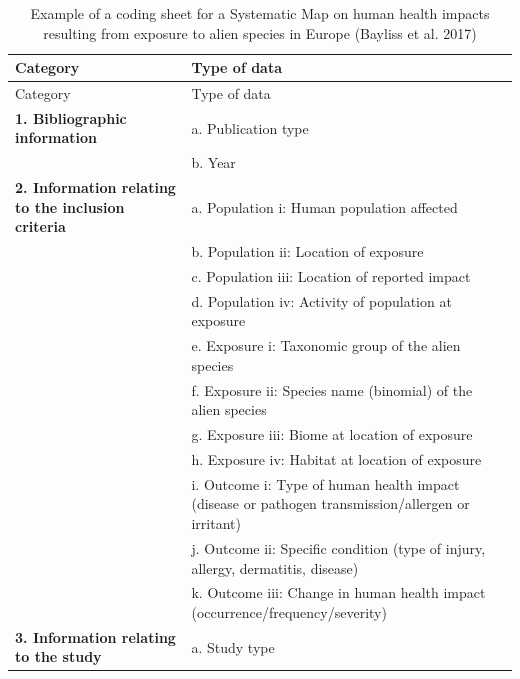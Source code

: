 \documentclass[
  letterpaper,
  DIV=11,
  numbers=noendperiod]{scrreprt}
\begin{document}
\begin{longtable}[]{@{}
  >{\raggedright\arraybackslash}p{}
  >{\raggedright\arraybackslash}p{}@{}}
\caption{Example of a coding sheet for a Systematic Map on human health
impacts resulting from exposure to alien species in Europe (Bayliss et
al. 2017)}\label{tbl-code}\tabularnewline
\toprule\noalign{}
\begin{minipage}[b]{\linewidth}\raggedright
Category
\end{minipage} & \begin{minipage}[b]{\linewidth}\raggedright
Type of data
\end{minipage} \\
\midrule\noalign{}
\endfirsthead
\toprule\noalign{}
\begin{minipage}[b]{\linewidth}\raggedright
Category
\end{minipage} & \begin{minipage}[b]{\linewidth}\raggedright
Type of data
\end{minipage} \\
\midrule\noalign{}
\endhead
\bottomrule\noalign{}
\endlastfoot
\textbf{1. Bibliographic information} & a. Publication type \\
& b. Year \\
\textbf{2. Information relating to the inclusion criteria} & a.
Population i: Human population affected \\
& b. Population ii: Location of exposure \\
& c. Population iii: Location of reported impact \\
& d. Population iv: Activity of population at exposure \\
& e. Exposure i: Taxonomic group of the alien species \\
& f. Exposure ii: Species name (binomial) of the alien species \\
& g. Exposure iii: Biome at location of exposure \\
& h. Exposure iv: Habitat at location of exposure \\
& i. Outcome i: Type of human health impact (disease or pathogen
transmission/allergen or irritant) \\
& j. Outcome ii: Specific condition (type of injury, allergy,
dermatitis, disease) \\
& k. Outcome iii: Change in human health impact
(occurrence/frequency/severity) \\
\textbf{3. Information relating to the study} & a. Study type

\end{longtable}
\end{document}
